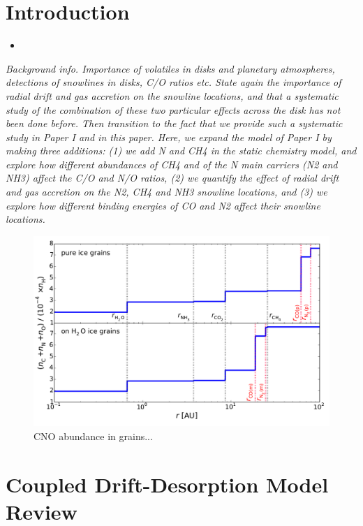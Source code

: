 \documentclass[apj]{emulateapj}
\newcommand{\emgr}[1]{\emph{ \color{gray} #1}}
\begin{document}
\section{Introduction}
\label{sec:intro}

\begin {itemize}
\item  
\end {itemize}

\emgr{Background info. Importance of volatiles in disks and planetary atmospheres, detections of snowlines in disks, C/O ratios etc. State again the importance of radial drift and gas accretion on the snowline locations, and that a systematic study of the combination of these two particular effects across the disk has not been done before. Then transition to the fact that we provide such a systematic study in Paper I and in this paper. Here, we expand the model of Paper I by making three additions: (1) we add N and CH4 in the static chemistry model, and explore how different abundances of CH4 and of the N main carriers (N2 and NH3) affect the C/O  and N/O ratios, (2) we quantify the effect of radial drift and gas accretion on the N2, CH4 and NH3 snowline locations, and (3) we explore how different binding energies of CO and N2 affect their snowline locations.}

\begin{figure}[t!]
\centering
\includegraphics[width=\textwidth]{../../figs/CNO_and_snowlines_2.pdf}
\caption{CNO abundance in grains...} 
\label{fig:CNOstatic}
\end{figure}

\section{Coupled Drift-Desorption Model Review}
\label{sec:review}
\end{document}

